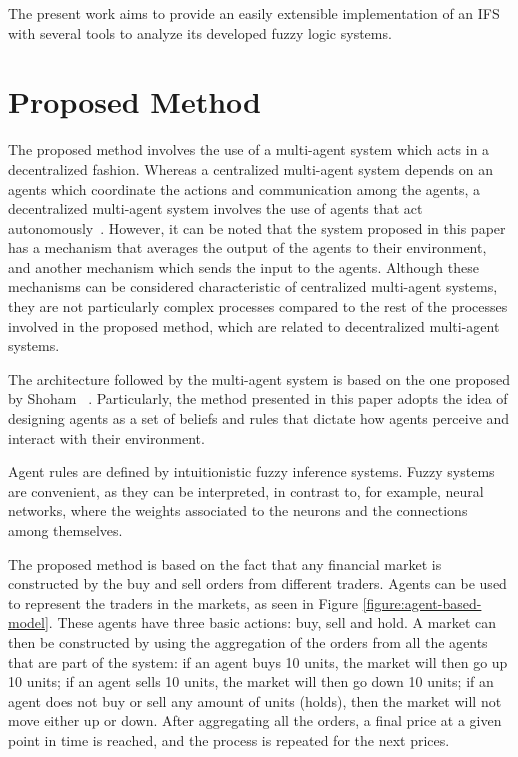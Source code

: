 \documentclass[review]{elsarticle}
\begin{document}
The present work aims to provide an easily extensible implementation of an IFS with several tools to analyze 
its developed fuzzy logic systems.

\section{Proposed Method}
\label{section:proposed-method}

The proposed method involves the use of a multi-agent system which acts in a decentralized fashion. Whereas a centralized multi-agent system depends on an agents which coordinate the actions and communication among the agents, a decentralized multi-agent system involves the use of agents that act autonomously~\cite{andreadis2014classification}. However, it can be noted that the system proposed in this paper has a mechanism that averages the output of the agents to their environment, and another mechanism which sends the input to the agents. Although these mechanisms can be considered characteristic of centralized multi-agent systems, they are not particularly complex processes compared to the rest of the processes involved in the proposed method, which are related to decentralized multi-agent systems.

The architecture followed by the multi-agent system is based on the one proposed by Shoham ~\cite{Shoham1993}. Particularly, the method presented in this paper adopts the idea of designing agents as a set of beliefs and rules that dictate how agents perceive and interact with their environment.

Agent rules are defined by intuitionistic fuzzy inference systems. Fuzzy systems are convenient, as they can be interpreted, in contrast to, for example, neural networks, where the weights associated to the neurons and the connections among themselves.

The proposed method is based on the fact that any financial market is constructed by the buy and sell orders from different traders. Agents can be used to represent the traders in the markets, as seen in Figure \ref{figure:agent-based-model}. These agents have three basic actions: buy, sell and hold. A market can then be constructed by using the aggregation of the orders from all the agents that are part of the system: if an agent buys 10 units, the market will then go up 10 units; if an agent sells 10 units, the market will then go down 10 units; if an agent does not buy or sell any amount of units (holds), then the market will not move either up or down. After aggregating all the orders, a final price at a given point in time is reached, and the process is repeated for the next prices.
\end{document}
